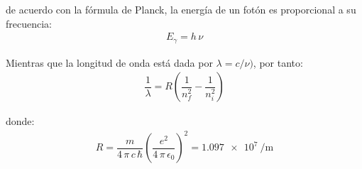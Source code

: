 de acuerdo con la fórmula de Planck, la energía de un fotón es proporcional a su frecuencia:
\begin{align}
E_{\gamma} = h \, \nu
\label{eq:ecuacion_04_92}
\end{align}

Mientras que la longitud de onda está dada por $\lambda = c / \nu)$, por tanto:
\begin{align}
\dfrac{1}{\lambda} = R \left( \dfrac{1}{n_{f}^{2}} - \dfrac{1}{n_{i}^{2}} \right)
\label{eq:ecuacion_04_93}
\end{align}

donde:
\begin{align}
R = \dfrac{m}{4 \, \pi \, c \, \hbar} \left( \dfrac{e^{2}}{4 \, \pi \, \epsilon_{0}} \right)^{2} = \SI{1.097e7}{\per\metre}
\label{eq:ecuacion_04_94}
\end{align}


